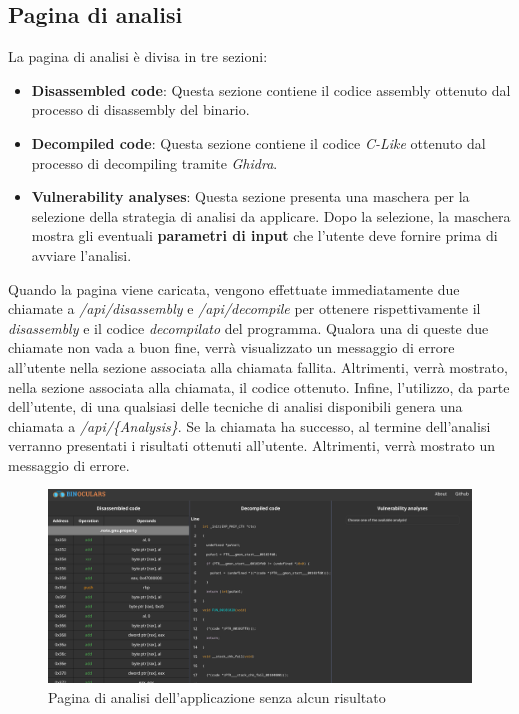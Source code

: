 \documentclass[../main.tex]{subfiles}
\begin{document}
\subsection{Pagina di analisi}
La pagina di analisi è divisa in tre sezioni:
\begin{itemize}
    \item \textbf{Disassembled code}: Questa sezione contiene il codice assembly ottenuto dal processo di disassembly del binario.
    \item \textbf{Decompiled code}: Questa sezione contiene il codice \textit{C-Like} ottenuto dal processo di decompiling tramite \textit{Ghidra}.
    \item \textbf{Vulnerability analyses}: Questa sezione presenta una maschera per la selezione della strategia di analisi da applicare.
    Dopo la selezione, la maschera mostra gli eventuali \textbf{parametri di input} che l'utente deve fornire prima di avviare l'analisi.
\end{itemize}
Quando la pagina viene caricata, vengono effettuate immediatamente due chiamate a \textit{/api/disassembly} e \textit{/api/decompile} per ottenere rispettivamente il \textit{disassembly} e il codice \textit{decompilato}
del programma. Qualora una di queste due chiamate non vada a buon fine, verrà visualizzato un messaggio di errore all'utente nella sezione associata alla chiamata fallita.
Altrimenti, verrà mostrato, nella sezione associata alla chiamata, il codice ottenuto.
Infine, l'utilizzo, da parte dell'utente, di una qualsiasi delle tecniche di analisi disponibili genera una chiamata a \textit{/api/\{Analysis\}}. Se la chiamata ha successo, al termine dell'analisi
verranno presentati i risultati ottenuti all'utente. Altrimenti, verrà mostrato un messaggio di errore.
\begin{figure}[H]
    \centering
    \includegraphics[width = \textwidth]{../images/analysis_page_no_results.png}
    \caption{Pagina di analisi dell'applicazione senza alcun risultato}
\end{figure}
\end{document}
